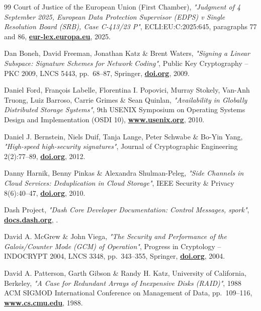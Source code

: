 \documentclass[10pt,a4paper,final]{article}
\let\oldhref\href
\renewcommand{\href}[2]{\oldhref{#1}{\bfseries#2}}
\begin{document}
\begin{thebibliography}{99}
	Court of Justice of the European Union (First Chamber),
	\emph{"Judgment of 4 September 2025, European Data Protection Supervisor (EDPS) v Single Resolution Board (SRB),
	Case C-413/23 P"},
	ECLI:EU:C:2025:645, paragraphs 77 and 86,
	\href{https://eur-lex.europa.eu/legal-content/EN/TXT/?uri=CELEX:62023CJ0413}{eur-lex.europa.eu},
	2025.

	Dan Boneh, David Freeman, Jonathan Katz \& Brent Waters,
	\emph{"Signing a Linear Subspace: Signature Schemes for Network Coding"},
	Public Key Cryptography -- PKC 2009, LNCS 5443, pp.~68--87, Springer,
	\href{https://doi.org/10.1007/978-3-642-00468-1_5}{doi.org},
	2009.

	Daniel Ford, Fran\c{c}ois Labelle, Florentina I. Popovici, Murray Stokely, Van-Anh Truong, Luiz Barroso, Carrie Grimes \& Sean Quinlan,
	\emph{"Availability in Globally Distributed Storage Systems"},
	9th USENIX Symposium on Operating Systems Design and Implementation (OSDI 10),
	\href{https://www.usenix.org/conference/osdi10/availability-globally-distributed-storage-systems}{www.usenix.org},
	2010.

	Daniel J. Bernstein, Niels Duif, Tanja Lange, Peter Schwabe \& Bo-Yin Yang,
	\emph{"High-speed high-security signatures"},
	Journal of Cryptographic Engineering 2(2):77--89,
	\href{https://doi.org/10.1007/s13389-012-0027-1}{doi.org},
	2012.

	Danny Harnik, Benny Pinkas \& Alexandra Shulman-Peleg,
	\emph{"Side Channels in Cloud Services: Deduplication in Cloud Storage"},
	IEEE Security \& Privacy 8(6):40--47,
	\href{https://doi.org/10.1109/MSP.2010.187}{doi.org},
	2010.

	Dash Project,
	\emph{"Dash Core Developer Documentation: Control Messages, spork"},
	\href{https://docs.dash.org/en/stable/docs/core/reference/p2p-network-control-messages.html\#spork}{docs.dash.org},
	\the\year{}.

	David A. McGrew \& John Viega,
	\emph{"The Security and Performance of the Galois/Counter Mode (GCM) of Operation"},
	Progress in Cryptology -- INDOCRYPT 2004, LNCS 3348, pp.~343--355, Springer,
	\href{https://doi.org/10.1007/978-3-540-30556-9_27}{doi.org},
	2004.

	David A. Patterson, Garth Gibson \& Randy H. Katz, University of California, Berkeley,
	\emph{"A Case for Redundant Arrays of Inexpensive Disks (RAID)"},
	1988 ACM SIGMOD International Conference on Management of Data, pp.~109--116,
	\href{https://www.cs.cmu.edu/~garth/RAIDpaper/Patterson88.pdf}{www.cs.cmu.edu},
	1988.


\end{thebibliography}
\end{document}
